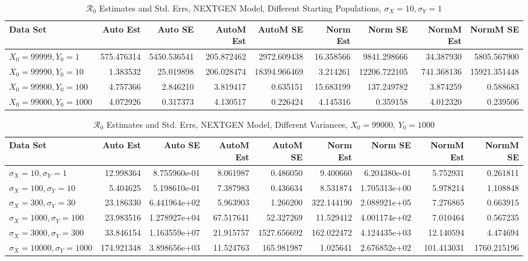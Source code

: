 \documentclass[12pt]{article}
\newcommand{\rr}{\ensuremath{\mathcal{R}_0}}
\begin{document}
\begin{table}[H]
	
	\caption{$\rr$ Estimates and Std. Errs, NEXTGEN Model,
		Different Starting Populations, 
		$\sigma_X = 10, \sigma_Y = 1$}
	\begin{footnotesize}
		\hskip -1.7cm
		\begin{tabular}{l|r|r|r|r|r|r|r|r}
			\hline
			Data Set & Auto Est & Auto SE & AutoM Est & AutoM SE & Norm Est & Norm SE & NormM Est & NormM SE\\
			\hline
			$X_0 = 99999, Y_0 = 1$ & 575.476314 & 5450.536541 & 205.872462 & 2972.609438 & 16.358566 & 9841.298666 & 34.387930 & 5805.567900\\
			\hline
			$X_0 = 99990, Y_0 = 10$ & 1.383532 & 25.019898 & 206.028474 & 18394.966469 & 3.214261 & 12206.722105 & 741.368136 & 15921.351448\\
			\hline
			$X_0 = 99900, Y_0 = 100$ & 4.757366 & 2.846210 & 3.819417 & 0.635151 & 15.683199 & 137.249782 & 3.874259 & 0.588683\\
			\hline
			$X_0 = 99000, Y_0 = 1000$ & 4.072926 & 0.317373 & 4.130517 & 0.226424 & 4.145316 & 0.359158 & 4.012320 & 0.239506\\
			\hline
		\end{tabular}
	\end{footnotesize}
\end{table}

\begin{table}[H]
	
	\caption{$\rr$ Estimates and Std. Errs, NEXTGEN Model, 
		Different Variances, $X_0 = 99000$, $Y_0 = 1000$}
	\begin{footnotesize}
		\hskip -1.7cm
		\begin{tabular}{l|r|r|r|r|r|r|r|r}
			\hline
			Data Set & Auto Est & Auto SE & AutoM Est & AutoM SE & Norm Est & Norm SE & NormM Est & NormM SE\\
			\hline
			$\sigma_X = 10, \sigma_Y = 1$ & 12.998364 & 8.755960e-01 & 8.061987 & 0.486050 & 9.400660 & 6.204380e-01 & 5.752931 & 0.261811\\
			\hline
			$\sigma_X = 100, \sigma_Y = 10$ & 5.404625 & 5.198610e-01 & 7.387983 & 0.436634 & 8.531874 & 1.705313e+00 & 5.978214 & 1.108848\\
			\hline
			$\sigma_X = 300, \sigma_Y = 30$ & 23.186330 & 6.441964e+02 & 5.963903 & 1.266200 & 322.144190 & 2.088921e+05 & 7.276865 & 0.663915\\
			\hline
			$\sigma_X = 1000, \sigma_Y = 100$ & 23.983516 & 1.278927e+04 & 67.517641 & 52.327269 & 11.529412 & 4.001174e+02 & 7.010464 & 0.567235\\
			\hline
			$\sigma_X = 3000, \sigma_Y = 300$ & 33.846154 & 1.163559e+07 & 21.915757 & 1527.656692 & 162.022472 & 4.124435e+03 & 12.140594 & 4.474694\\
			\hline
			$\sigma_X = 10000, \sigma_Y = 1000$ & 174.921348 & 3.898656e+03 & 11.524763 & 165.981987 & 1.025641 & 2.676852e+02 & 101.413031 & 1760.215196\\
			\hline
		\end{tabular}
	\end{footnotesize}
\end{table}
\end{document}
